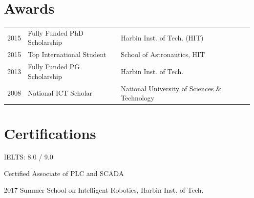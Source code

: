 \documentclass[a4paper]{deedy-resume} %
\begin{document}
\begin{minipage}[t]{0.66\textwidth}

\section{Awards} 

\begin{tabular}{rll}
2015 & Fully Funded PhD Scholarship & Harbin Inst. of Tech. (HIT) \\
2015 & Top International Student & School of Astronautics, HIT \\
2013 & Fully Funded PG Scholarship & Harbin Inst. of Tech. \\
2008 & National ICT Scholar & National University of Sciences \& Technology
\end{tabular}

\sectionspace %


\section{Certifications}

\vspace{\topsep} %

\begin{tightitemize}
	\item IELTS: 8.0 / 9.0
	\item Certified Associate of PLC and SCADA
	\item 2017 Summer School on Intelligent Robotics, Harbin Inst. of Tech.
\end{tightitemize}






\end{minipage} %
\end{document}
